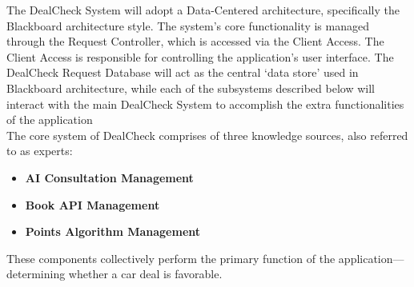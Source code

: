 \documentclass[]{article}
\begin{document}
\label{sub:system_architecture}

\indent \indent The DealCheck System will adopt a Data-Centered architecture, specifically the Blackboard architecture style. The system’s core 
functionality is managed through the Request Controller, which is accessed via the Client Access. The Client Access is responsible for controlling 
the application's user interface. The DealCheck Request Database will act as the central ‘data store’ used in Blackboard architecture, while each 
of the subsystems described below will interact with the main DealCheck System to accomplish the extra functionalities of the application \\

\noindent
The core system of DealCheck comprises of three knowledge sources, also referred to as experts: \\
\begin{itemize}
    \item \textbf{AI Consultation Management}
    \item \textbf{Book API Management}
    \item \textbf{Points Algorithm Management}
\end{itemize}
\noindent
These components collectively perform the primary function of the application—determining whether a car deal is favorable. \\
\end{document}
